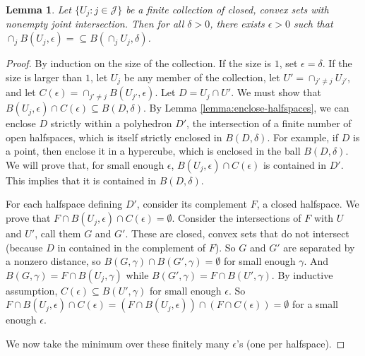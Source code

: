 \documentclass{article}
\newcommand{\Comments}{1}
\newcommand{\mynote}[2]{\ifnum\Comments=1\textcolor{#1}{#2}\fi}
\newcommand{\raf}[1]{\mynote{green}{[RF: #1]}}
\newtheorem{lemma}{Lemma}
\begin{document}
\begin{lemma} \label{lemma:thick-nonempty}
  Let $\{U_j : j \in \mathcal{J}\}$ be a finite collection of closed, convex sets with nonempty joint intersection.
  Then for all $\delta > 0$, there exists  $\epsilon > 0$ such that $\cap_j B(U_j,\epsilon) = \subseteq B(\cap_j U_j, \delta)$.
\end{lemma}
\begin{proof}
  By induction on the size of the collection.
  If the size is $1$, set $\epsilon = \delta$.
  If the size is larger than $1$, let $U_j$ be any member of the collection, let $U' = \cap_{j'\neq j} U_{j'}$, and let $C(\epsilon) = \cap_{j' \neq j} B(U_{j'},\epsilon)$.
  Let $D = U_j \cap U'$.
  We must show that $B(U_j,\epsilon) \cap C(\epsilon) \subseteq B(D,\delta)$.
  By Lemma \ref{lemma:enclose-halfspaces}, we can enclose $D$ strictly within a polyhedron $D'$, the intersection of a finite number of open halfspaces, which is itself strictly enclosed in $B(D,\delta)$.
  For example, if $D$ is a point, then enclose it in a hypercube, which is enclosed in the ball $B(D,\delta)$.
  We will prove that, for small enough $\epsilon$, $B(U_j,\epsilon) \cap C(\epsilon)$ is contained in $D'$.
  This implies that it is contained in $B(D,\delta)$.

  For each halfspace defining $D'$, consider its complement $F$, a closed halfspace.
  We prove that $F \cap B(U_j,\epsilon) \cap C(\epsilon) = \emptyset$.
  Consider the intersections of $F$ with $U$ and $U'$, call them $G$ and $G'$.
  These are closed, convex sets that do not intersect (because $D$ in contained in the complement of $F$).
  So $G$ and $G'$ are separated by a nonzero distance, so $B(G,\gamma) \cap B(G',\gamma) = \emptyset$ for small enough $\gamma$.
  And $B(G,\gamma) = F \cap B(U_j,\gamma)$ while $B(G',\gamma) = F \cap B(U',\gamma)$.
  By inductive assumption, $C(\epsilon) \subseteq B(U',\gamma)$ for small enough $\epsilon$.
  So $F \cap B(U_j,\epsilon) \cap C(\epsilon) = \left(F \cap B(U_j,\epsilon)\right) \cap \left(F \cap C(\epsilon)\right) = \emptyset$ for a small enough $\epsilon$.

  We now take the minimum over these finitely many $\epsilon$'s (one per halfspace).
\end{proof}
\end{document}
